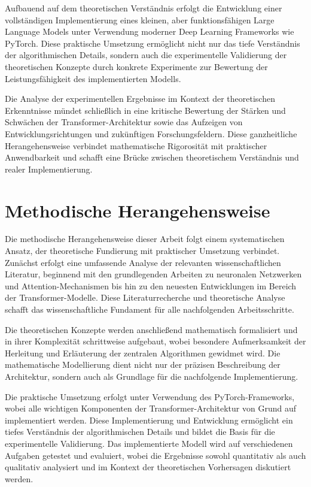 Aufbauend auf dem theoretischen Verständnis erfolgt die Entwicklung einer vollständigen Implementierung eines kleinen, aber funktionsfähigen Large Language Models unter Verwendung moderner Deep Learning Frameworks wie PyTorch. Diese praktische Umsetzung ermöglicht nicht nur das tiefe Verständnis der algorithmischen Details, sondern auch die experimentelle Validierung der theoretischen Konzepte durch konkrete Experimente zur Bewertung der Leistungsfähigkeit des implementierten Modells.

Die Analyse der experimentellen Ergebnisse im Kontext der theoretischen Erkenntnisse mündet schließlich in eine kritische Bewertung der Stärken und Schwächen der Transformer-Architektur sowie das Aufzeigen von Entwicklungsrichtungen und zukünftigen Forschungsfeldern. Diese ganzheitliche Herangehensweise verbindet mathematische Rigorosität mit praktischer Anwendbarkeit und schafft eine Brücke zwischen theoretischem Verständnis und realer Implementierung.

\section{Methodische Herangehensweise}

Die methodische Herangehensweise dieser Arbeit folgt einem systematischen Ansatz, der theoretische Fundierung mit praktischer Umsetzung verbindet. Zunächst erfolgt eine umfassende Analyse der relevanten wissenschaftlichen Literatur, beginnend mit den grundlegenden Arbeiten zu neuronalen Netzwerken und Attention-Mechanismen bis hin zu den neuesten Entwicklungen im Bereich der Transformer-Modelle. Diese Literaturrecherche und theoretische Analyse schafft das wissenschaftliche Fundament für alle nachfolgenden Arbeitsschritte.

Die theoretischen Konzepte werden anschließend mathematisch formalisiert und in ihrer Komplexität schrittweise aufgebaut, wobei besondere Aufmerksamkeit der Herleitung und Erläuterung der zentralen Algorithmen gewidmet wird. Die mathematische Modellierung dient nicht nur der präzisen Beschreibung der Architektur, sondern auch als Grundlage für die nachfolgende Implementierung.

Die praktische Umsetzung erfolgt unter Verwendung des PyTorch-Frameworks, wobei alle wichtigen Komponenten der Transformer-Architektur von Grund auf implementiert werden. Diese Implementierung und Entwicklung ermöglicht ein tiefes Verständnis der algorithmischen Details und bildet die Basis für die experimentelle Validierung. Das implementierte Modell wird auf verschiedenen Aufgaben getestet und evaluiert, wobei die Ergebnisse sowohl quantitativ als auch qualitativ analysiert und im Kontext der theoretischen Vorhersagen diskutiert werden.

